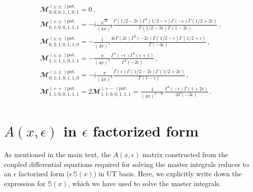 \begin{align}
    \begin{split}
        &
        \mathbfcal{M}^{(\pm\pm)\textrm{pot.}}_{0,0;0,1,1,0,1}=0\,,\\ &
\mathbfcal{M}^{(\pm\pm)\textrm{pot.}}_{0,1;0,0,1,1,1}=-i \frac{\sqrt{\pi}}{(4\pi)^3}\frac{\Gamma(1/2-2\epsilon)\Gamma^2(1/2-\epsilon)\Gamma(-\epsilon)\Gamma(1/2+2\epsilon)}{\Gamma(1/2-3\epsilon)\Gamma(1-2\epsilon)}\,,\\ &    \mathbfcal{M}^{(\pm\pm)\textrm{pot.}}_{0,2;1,0,1,1,0}=-\frac{1}{(4\pi)^3}\frac{4\epsilon\Gamma(2\epsilon)\Gamma^2(-2\epsilon)\Gamma(1/2-\epsilon)\Gamma(1/2+\epsilon)}{\Gamma(-4\epsilon)}\,,\\ &
\mathbfcal{M}^{(\pm\pm)\textrm{pot.}}_{1,1;1,1,0,1,1}=-\frac{\pi}{(4\pi)^3}\frac{\Gamma^4(-\epsilon)\Gamma^2(\epsilon+1)}{\Gamma^2(-2\epsilon)}\,,\\ &
\mathbfcal{M}^{(\pm\pm)\textrm{pot.}}_{0,1;1,0,1,1,0}=-i\frac{\pi}{(4\pi)^3}\frac{\Gamma(\epsilon)\Gamma(1/2-2\epsilon)\Gamma(1/2+2\epsilon)}{\Gamma(1-\epsilon)}\,,\\ &
\mathbfcal{M}^{(++)\textrm{pot.}}_{1,1;0,0,1,1,1}=2\mathbfcal{M}^{(+-)\textrm{pot.}}_{1,1;0,0,1,1,1}=\frac{1}{(4\pi)^{2-2\epsilon}}\frac{\Gamma^3(-\epsilon)\Gamma(1+2\epsilon)}{3\Gamma(-3\epsilon)}\,.
    \end{split}
\end{align}
\section{\texorpdfstring{$A(x,\epsilon)$ in $\epsilon$ factorized form}{A(x, epsilon) in epsilon-factorized form}} \label{ch3:app:C}

As mentioned in the main text, the $A(x,\epsilon)$ matrix constructed from the coupled differential equations required for solving the master integrals reduces to an  $\epsilon$ factorized form ($\epsilon\,\mathbb{S}(x)$) in UT basis. Here, we explicitly  write down the expression for $\mathbb{S}(x)$, which we have used to solve the master integrals. 

